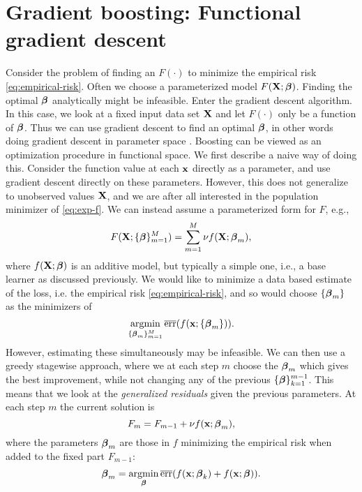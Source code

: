 \section{Gradient boosting: Functional gradient descent}
Consider the problem of finding an $F(\cdot)$ to minimize the empirical risk \eqref{eq:empirical-risk}. Often we choose a parameterized model $F(\mathbf{X};\boldsymbol{\beta})$. Finding the optimal $\boldsymbol{\beta}$ analytically might be infeasible. Enter the gradient descent algorithm. In this case, we look at a fixed input data set $\mathbf{X}$ and let $F(\cdot)$ only be a function of $\boldsymbol{\beta}$. Thus we can use gradient descent to find an optimal $\boldsymbol{\beta}$, in other words doing gradient descent in parameter space \citep{friedman2001}. Boosting can be viewed as an optimization procedure in functional space. We first describe a naive way of doing this. Consider the function value at each $\mathbf{x}$ directly as a parameter, and use gradient descent directly on these parameters. However, this does not generalize to unobserved values $\mathbf{X}$, and we are after all interested in the population minimizer of \eqref{eq:exp-f}. We can instead assume a parameterized form for $F$, e.g.,
\begin{equation}\label{eq:gradboost}
    F(\mathbf{X};\{\boldsymbol{\beta}\}_{m=1}^M)=\sum_{m=1}^M\nu f(\mathbf{X};\boldsymbol{\beta}_m),
\end{equation}
where $f(\mathbf{X};\boldsymbol{\beta})$ is an additive model, but typically a simple one, i.e., a base learner as discussed previously. We would like to minimize a data based estimate of the loss, i.e. the empirical risk \eqref{eq:empirical-risk}, and so would choose $\{\boldsymbol{\beta}_m\}$ as the minimizers of 
\begin{equation*}
    \operatorname*{argmin}_{\{\boldsymbol{\beta}_m\}_{m=1}^M}\overline{\text{err}}(f(\mathbf{x};\{\boldsymbol{\beta}_m\})).
\end{equation*}
However, estimating these simultaneously may be infeasible. We can then use a greedy stagewise approach, where we at each step $m$ choose the $\boldsymbol{\beta}_m$ which gives the best improvement, while not changing any of the previous $\{\boldsymbol{\beta}\}_{k=1}^{m-1}$. This means that we look at the \textit{generalized residuals} given the previous parameters. At each step $m$ the current solution is
\begin{equation*}
    F_{m}=F_{m-1}+\nu f(\mathbf{x};\boldsymbol{\beta}_m),
\end{equation*}
where the parameters $\boldsymbol{\beta}_m$ are those in $f$ minimizing the empirical risk when added to the fixed part $F_{m-1}$:
\begin{equation*}
    \boldsymbol{\beta}_m=\operatorname*{argmin}_{\boldsymbol{\beta}}\overline{\text{err}}(f(\mathbf{x};\boldsymbol{\beta}_k)+f(\mathbf{x};\boldsymbol{\beta})).
\end{equation*}

